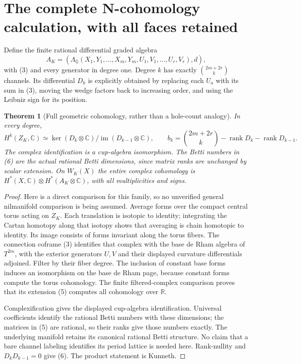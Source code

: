 \documentclass[11pt]{article}
\newtheorem{theorem}{Theorem}
\newcommand{\Q}{\mathbb Q}
\newcommand{\C}{\mathbb C}
\newcommand{\R}{\mathbb R}
\newcommand{\rank}{\operatorname{rank}}
\begin{document}
\section{The complete N-cohomology calculation, with all faces retained}
Define the finite rational differential graded algebra
\[
 A_K=\left(\Lambda_\Q(X_1,Y_1,\ldots,X_m,Y_m,
                         U_1,V_1,\ldots,U_r,V_r),d\right),       \tag{5}
\]
with (3) and every generator in degree one. Degree $k$ has exactly
$\binom{2m+2r}{k}$ channels. Its differential $D_k$ is explicitly obtained
by replacing each $U_a$ with its sum in (3), moving the wedge factors
back to increasing order, and using the Leibniz sign for its position.

\begin{theorem}[Full geometric cohomology, rather than a hole-count analogy]
In every degree,
\[
 H^k(Z_K,\C)\simeq\ker(D_k\otimes\C)/\operatorname{im}(D_{k-1}\otimes\C),\qquad
 b_k=\binom{2m+2r}{k}-\rank D_k-\rank D_{k-1}.         \tag{6}
\]
The complex identification is a cup-algebra isomorphism. The Betti numbers
in (6) are the actual rational Betti dimensions, since matrix ranks are
unchanged by scalar extension. On $W_K(X)$ the entire complex cohomology is
$H^*(X,\C)\otimes H^*(A_K\otimes\C)$, with all multiplicities and signs.
\end{theorem}
\begin{proof}
Here is a direct comparison for this family, so no unverified general
nilmanifold comparison is being assumed. Average forms over the compact
central torus acting on $Z_K$. Each translation is isotopic to identity;
integrating the Cartan homotopy along that isotopy shows that averaging
is chain homotopic to identity. Its image consists of forms invariant along
the torus fibers. The connection coframe (3) identifies that complex with
the base de Rham algebra of $T^{2m}$, with the exterior generators $U,V$
and their displayed curvature differentials adjoined. Filter by their
fiber degree. The inclusion of constant base forms induces an isomorphism
on the base de Rham page, because constant forms compute the torus
cohomology. The finite filtered-complex comparison proves that its
extension (5) computes all cohomology over $\R$.

Complexification gives the displayed cup-algebra identification. Universal
coefficients identify the rational Betti numbers with these dimensions;
the matrices in (5) are rational, so their ranks give those numbers exactly.
The underlying manifold retains its canonical rational Betti structure.
No claim that a bare channel labeling identifies its period lattice is
needed here. Rank-nullity and $D_kD_{k-1}=0$ give (6). The product statement
is Kunneth.
\end{proof}
\end{document}
